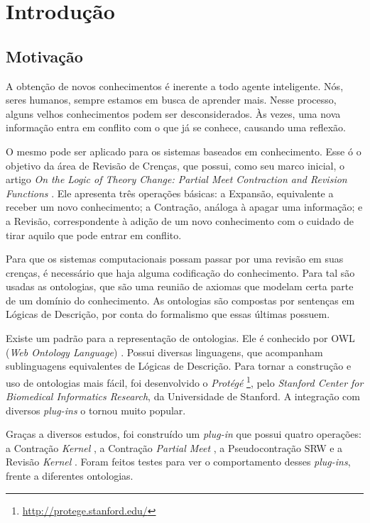 \chapter{Introdução}

\section{Motivação}

A obtenção de novos conhecimentos é inerente a todo agente inteligente. Nós, seres humanos, sempre estamos em busca de aprender mais. Nesse processo, alguns velhos conhecimentos podem ser desconsiderados. Às vezes, uma nova informação entra em conflito com o que já se conhece, causando uma reflexão.

O mesmo pode ser aplicado para os sistemas baseados em conhecimento. Esse ó o objetivo da área de Revisão de Crenças, que possui, como seu marco inicial, o artigo \textit{On the Logic of Theory Change: Partial Meet Contraction and Revision Functions} \citep{revisaoAGM}. Ele apresenta três operações básicas: a Expansão, equivalente a receber um novo conhecimento; a Contração, análoga à apagar uma informação; e a Revisão, correspondente à adição de um novo conhecimento com o cuidado de tirar aquilo que pode entrar em conflito.

Para que os sistemas computacionais possam passar por uma revisão em suas crenças, é necessário que haja alguma codificação do conhecimento. Para tal são usadas as ontologias, que são uma reunião de axiomas que modelam certa parte de um domínio do conhecimento. As ontologias são compostas por sentenças em Lógicas de Descrição, por conta do formalismo que essas últimas possuem.

Existe um padrão para a representação de ontologias. Ele é conhecido por OWL (\textit{Web Ontology Language}) \citep{ferramentasOWL2}. Possui diversas linguagens, que acompanham sublinguagens equivalentes de Lógicas de Descrição. Para tornar a construção e uso de ontologias mais fácil, foi desenvolvido o \textit{Protégé} \footnote{\url{http://protege.stanford.edu/}}, pelo \textit{Stanford Center for Biomedical Informatics Research}, da Universidade de Stanford. A integração com diversos \textit{plug-ins} o tornou muito popular.  

Graças a diversos estudos, foi construído um \textit{plug-in} que possui quatro operações: a Contração \textit{Kernel} \citep{revisaoHansson5}, a Contração \textit{Partial Meet} \citep{revisaoAGM}, a Pseu\-do\-con\-tra\-ção SRW \citep{revisaoSantos} e a Revisão \textit{Kernel} \citep{revisaoRibeiro2}. Foram feitos testes para ver o comportamento desses \textit{plug-ins}, frente a diferentes ontologias.

